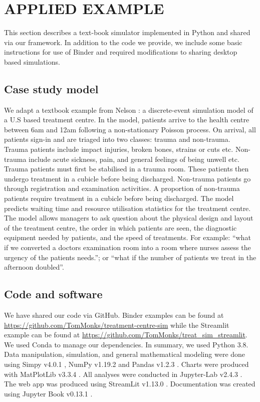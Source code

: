 \documentclass{swpaperproc}
\theoremstyle{sw}
\begin{document}
\section{APPLIED EXAMPLE}

This section describes a text-book simulator implemented in Python and shared via our framework. In addition to the code we provide, we include some basic instructions for use of Binder and required modifications to sharing desktop based simulations.

\subsection{Case study model}

We adapt a textbook example from Nelson \cite[p.170]{nelson2013}: a discrete-event simulation model of a U.S based treatment centre. In the model, patients arrive to the health centre between 6am and 12am following a non-stationary Poisson process. On arrival, all patients sign-in and are triaged into two classes: trauma and non-trauma. Trauma patients include impact injuries, broken bones, strains or cuts etc. Non-trauma include acute sickness, pain, and general feelings of being unwell etc. Trauma patients must first be stabilised in a trauma room. These patients then undergo treatment in a cubicle before being discharged. Non-trauma patients go through registration and examination activities. A proportion of non-trauma patients require treatment in a cubicle before being discharged. The model predicts waiting time and resource utilisation statistics for the treatment centre. The model allows managers to ask question about the physical design and layout of the treatment centre, the order in which patients are seen, the diagnostic equipment needed by patients, and the speed of treatments. For example: “what if we converted a doctors examination room into a room where nurses assess the urgency of the patients needs.”; or “what if the number of patients we treat in the afternoon doubled”.

\subsection{Code and software}

We have shared our code via GitHub. Binder examples can be found at \url{https://github.com/TomMonks/treatment-centre-sim} while the Streamlit example can be found at \url{https://github.com/TomMonks/treat_sim_streamlit}. We used Conda to manage our dependencies.  In summary, we used Python 3.8. Data manipulation, simulation, and general mathematical modeling were done using Simpy v4.0.1 \cite{simpy}, NumPy v1.19.2 \cite{numpy} and Pandas v1.2.3 \cite{mckinney2011pandas}. Charts were produced with MatPlotLib v3.3.4 \cite{Hunter:2007}. All analyses were conducted in Jupyter-Lab v2.4.3 \cite{jupyterlab_jupyterlab_2022}. The web app was produced using StreamLit v1.13.0 \cite{streamlit}.  Documentation was created using Jupyter Book v0.13.1 \cite{executable_books_community_2020_4539666}. 
\end{document}
